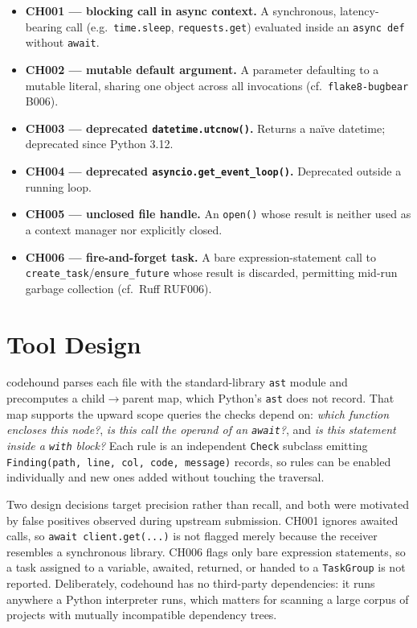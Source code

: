 \documentclass[conference]{IEEEtran}
\begin{document}
\begin{itemize}
  \item \textbf{CH001 --- blocking call in async context.} A synchronous, latency-bearing call (e.g.\ \texttt{time.sleep}, \texttt{requests.get}) evaluated inside an \texttt{async def} without \texttt{await}.
  \item \textbf{CH002 --- mutable default argument.} A parameter defaulting to a mutable literal, sharing one object across all invocations (cf.\ \texttt{flake8-bugbear} B006).
  \item \textbf{CH003 --- deprecated \texttt{datetime.utcnow()}.} Returns a na\"ive datetime; deprecated since Python 3.12.
  \item \textbf{CH004 --- deprecated \texttt{asyncio.get\_event\_loop()}.} Deprecated outside a running loop.
  \item \textbf{CH005 --- unclosed file handle.} An \texttt{open()} whose result is neither used as a context manager nor explicitly closed.
  \item \textbf{CH006 --- fire-and-forget task.} A bare expression-statement call to \texttt{create\_task}/\texttt{ensure\_future} whose result is discarded, permitting mid-run garbage collection (cf.\ Ruff RUF006).
\end{itemize}

\section{Tool Design}
\label{sec:tool}
codehound parses each file with the standard-library \texttt{ast} module and precomputes a child$\rightarrow$parent map, which Python's \texttt{ast} does not record. That map supports the upward scope queries the checks depend on: \emph{which function encloses this node?}, \emph{is this call the operand of an \texttt{await}?}, and \emph{is this statement inside a \texttt{with} block?} Each rule is an independent \texttt{Check} subclass emitting \texttt{Finding(path, line, col, code, message)} records, so rules can be enabled individually and new ones added without touching the traversal.

Two design decisions target precision rather than recall, and both were motivated by false positives observed during upstream submission. CH001 ignores awaited calls, so \texttt{await client.get(...)} is not flagged merely because the receiver resembles a synchronous library. CH006 flags only bare expression statements, so a task assigned to a variable, awaited, returned, or handed to a \texttt{TaskGroup} is not reported. Deliberately, codehound has no third-party dependencies: it runs anywhere a Python interpreter runs, which matters for scanning a large corpus of projects with mutually incompatible dependency trees.
\end{document}
